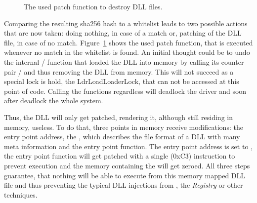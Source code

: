 \begin{figure}[h]
\inputminted[breakanywhere, breaklines,fontsize=\scriptsize, frame=single, mathescape, linenos, numbersep=5pt, numbersep=5pt, xleftmargin=0pt]{c}{sections/implementation/code6.c}
\caption{The used patch function to destroy DLL files.}
\label{code:code6}
\end{figure}
Comparing the resulting sha256 hash to a whitelist leads to two possible actions that are now taken: doing nothing, in case of a match or, patching of the \gls{DLL} file, in case of no match. Figure~\ref{code:code6} shows the used patch function, that is executed whenever no match in the whitelist is found.
An initial thought could be to undo the internal / function that loaded the \gls{DLL} into memory by calling its counter pair / and thus removing the \gls{DLL} from memory. This will not succeed as a special lock is hold, the LdrLoadLoaderLock, that can not be accessed at this point of code. Calling the functions regardless will deadlock the driver and soon after deadlock the whole system. 

\medskip

Thus, the \gls{DLL} will only get patched, rendering it, although still residing in memory, useless. To do that, three points in memory receive modifications: the entry point address, the , which describes the file format of a \gls{DLL} with many meta information and the entry point function. The entry point address is set to , the entry point function will get patched with a single  (0xC3) instruction to prevent execution and the memory containing the  will get zeroed. All three steps guarantee, that nothing will be able to execute from this memory mapped \gls{DLL} file and thus preventing the typical \gls{DLL} injections from , the \emph{Registry} or other techniques.

